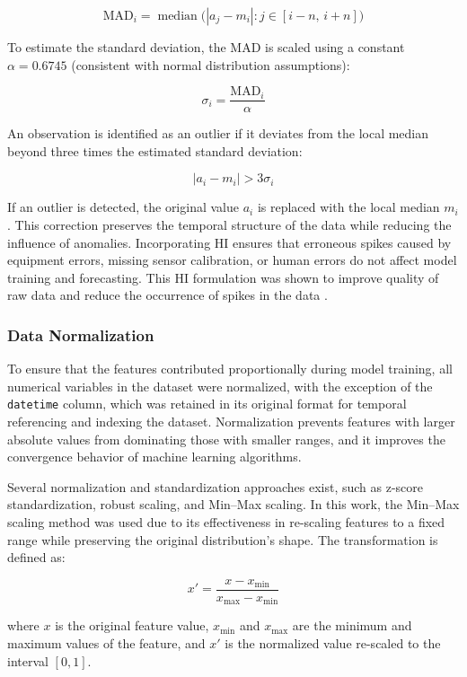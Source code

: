 \[
\mathrm{MAD}_i = \operatorname{median}\big(|a_{j} - m_i| : j \in [i-n,\, i+n]\big)
\tag{2}
\]

To estimate the standard deviation, the MAD is scaled using a constant \(\alpha = 0.6745\) (consistent with normal distribution assumptions):

\[
\sigma_i = \frac{\mathrm{MAD}_i}{\alpha}
\tag{3}
\]

An observation is identified as an outlier if it deviates from the local median beyond three times the estimated standard deviation:

\[
|a_i - m_i| > 3\sigma_i
\tag{4}
\]

If an outlier is detected, the original value \(a_i\) is replaced with the local median \(m_i\). This correction preserves the temporal structure of the data while reducing the influence of anomalies. Incorporating HI ensures that erroneous spikes caused by equipment errors, missing sensor calibration, or human errors do not affect model training and forecasting. This HI formulation was shown to improve quality of raw data and reduce the occurrence of spikes in the data \cite{hiceemdanQteg}.

\subsubsection{Data Normalization}

To ensure that the features contributed proportionally during model training, all numerical variables in the dataset were normalized, with the exception of the \texttt{datetime} column, which was retained in its original format for temporal referencing and indexing the dataset. Normalization prevents features with larger absolute values from dominating those with smaller ranges, and it improves the convergence behavior of machine learning algorithms.

Several normalization and standardization approaches exist, such as z-score standardization, robust scaling, and Min–Max scaling. In this work, the Min–Max scaling method was used due to its effectiveness in re-scaling features to a fixed range while preserving the original distribution’s shape. The transformation is defined as:

\[
x' = \frac{x - x_{\min}}{x_{\max} - x_{\min}}
\tag{5}
\]

where \(x\) is the original feature value, \(x_{\min}\) and \(x_{\max}\) are the minimum and maximum values of the feature, and \(x'\) is the normalized value re-scaled to the interval \([0,1]\).

